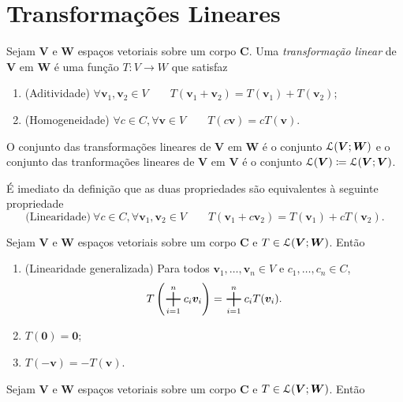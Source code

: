 \section{Transformações Lineares}

\begin{defi}
	Sejam $\bm V$ e $\bm W$ espaços vetoriais sobre um corpo $\bm C$. Uma \emph{transformação linear} de $\bm V$ em $\bm W$ é uma função $T: V \to W$ que satisfaz
	\begin{enumerate}
	\item (Aditividade) $\forall \bm v_1,\bm v_2 \in V \qquad T(\bm v_1 + \bm v_2) = T(\bm v_1)+T(\bm v_2)$;
	\item (Homogeneidade) $\forall c \in C, \forall \bm v \in V \qquad T(c\bm v)=cT(\bm v)$.
	\end{enumerate}
O conjunto das transformações lineares de $\bm V$ em $\bm W$ é o conjunto $\mathcal{L}(\bm V;\bm W)$ e o conjunto das tranformações lineares de $\bm V$ em $\bm V$ é o conjunto $\mathcal{L}(\bm V) \coloneqq \mathcal{L}(\bm V;\bm V)$.
\end{defi}

	É imediato da definição que as duas propriedades são equivalentes à seguinte propriedade
	\begin{equation*}
	\text{(Linearidade)}\ \forall c \in C, \forall \bm v_1,\bm v_2 \in V \qquad T(\bm v_1 + c\bm v_2) = T(\bm v_1)+cT(\bm v_2).
	\end{equation*}

\begin{prop}
	Sejam $\bm V$ e $\bm W$ espaços vetoriais sobre um corpo $\bm C$ e $T \in \mathcal{L}(\bm V;\bm W)$. Então
	\begin{enumerate}
	\item (Linearidade generalizada) Para todos $\bm v_1,\ldots,\bm v_n \in V$ e $c_1,\ldots,c_n \in C$,
	\begin{equation*}
	T\left(\bigsum_{i=1}^n c_i \bm v_i \right) = \bigsum_{i=1}^n c_i T(\bm v_i).
	\end{equation*}

	\item $T(\bm 0) = \bm 0$;

	\item $T(-\bm v)=-T(\bm v)$.
\end{enumerate}
\end{prop}

\begin{prop}
	Sejam $\bm V$ e $\bm W$ espaços vetoriais sobre um corpo $\bm C$ e $T \in \mathcal{L}(\bm V;\bm W)$. Então
\end{prop}

